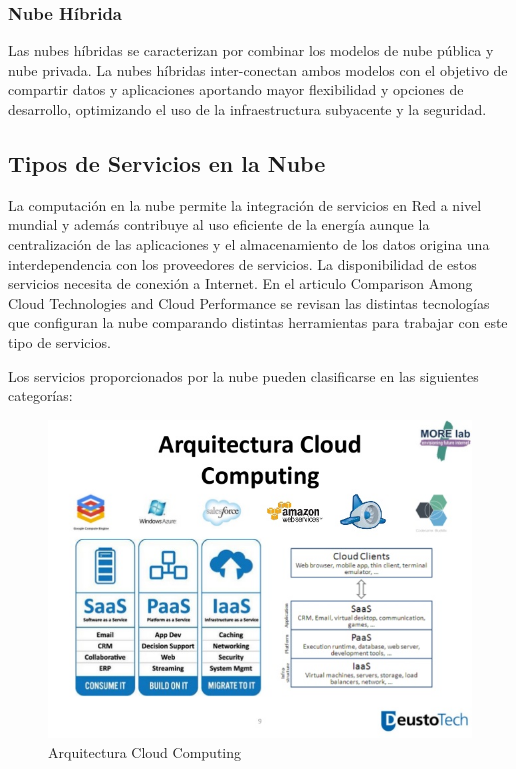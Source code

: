 \documentclass[a4paper,11pt]{book}
\begin{document}
\subsubsection{Nube Híbrida}

Las nubes híbridas se caracterizan por combinar los modelos de nube pública y nube privada. La nubes híbridas inter-conectan ambos modelos con el objetivo de compartir datos y aplicaciones aportando mayor flexibilidad y opciones de desarrollo, optimizando el uso de la infraestructura subyacente y la seguridad.


\subsection{Tipos de Servicios en la Nube}

La computación en la nube permite la integración de servicios en Red a nivel mundial y además contribuye al uso eficiente de la energía aunque la centralización de las aplicaciones y el almacenamiento de los datos origina una interdependencia con los proveedores de servicios. La disponibilidad de estos servicios necesita de conexión a Internet.  En el articulo Comparison Among Cloud Technologies and Cloud Performance\cite{cloudtech} se revisan las distintas tecnologías que configuran la nube comparando distintas herramientas para trabajar con este tipo de servicios.

Los servicios proporcionados por la nube pueden clasificarse en las siguientes categorías:

\begin{figure}[H]
\centering
\includegraphics[scale=0.5]{imagenes/arquitecturaCC.jpg}
\caption{ Arquitectura Cloud Computing\cite{arquitecturaCC} }
\end{figure}
\end{document}

